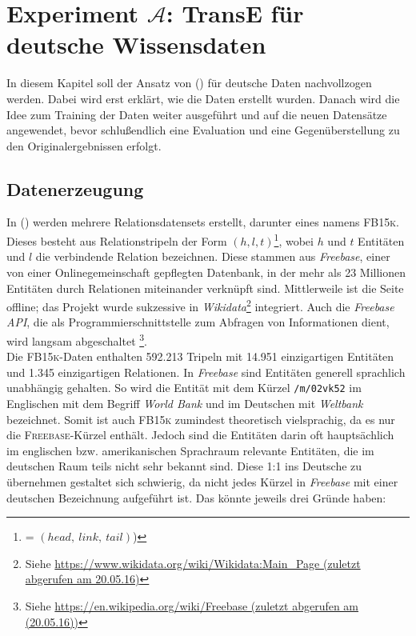 
\chapter{Experiment $\mathcal{A}$: TransE für deutsche Wissensdaten} %

\label{Chapter6} %


In diesem Kapitel soll der Ansatz von (\cite{bordes2013translating}) für deutsche Daten nachvollzogen werden.
Dabei wird erst erklärt, wie die Daten erstellt wurden. Danach wird die Idee zum Training der Daten weiter ausgeführt und
auf die neuen Datensätze angewendet, bevor schlußendlich eine Evaluation und eine Gegenüberstellung zu den Originalergebnissen
erfolgt.

\section{Datenerzeugung}

In (\cite{bordes2013translating}) werden mehrere Relationsdatensets erstellt, darunter eines namens \textsc{FB15k}. Dieses
besteht aus Relationstripeln der Form $(h, l, t)$\footnote{= $(head,\ link,\ tail)$)}, wobei
$h$ und $t$ Entitäten und $l$ die verbindende Relation bezeichnen. Diese stammen aus \emph{Freebase}, einer
von einer Onlinegemeinschaft gepflegten Datenbank, in der mehr als 23 Millionen Entitäten durch Relationen miteinander verknüpft sind.
Mittlerweile ist die Seite offline; das Projekt wurde sukzessive in \emph{Wikidata}\footnote{Siehe \url{https://www.wikidata.org/wiki/Wikidata:Main_Page (zuletzt abgerufen am 20.05.16)}} integriert. Auch die
\emph{Freebase API}, die als Programmierschnittstelle zum Abfragen von Informationen dient, wird langsam abgeschaltet
\footnote{Siehe \url{https://en.wikipedia.org/wiki/Freebase (zuletzt abgerufen am (20.05.16))}}.\\

Die \textsc{FB15k}-Daten enthalten 592.213 Tripeln mit 14.951 einzigartigen Entitäten und 1.345 einzigartigen Relationen.
In \emph{Freebase} sind Entitäten generell sprachlich unabhängig gehalten. So wird die Entität mit dem Kürzel \verb|/m/02vk52|
im Englischen mit dem Begriff \emph{World Bank} und im Deutschen mit \emph{Weltbank} bezeichnet. Somit ist auch
\textsc{FB15k} zumindest theoretisch vielsprachig, da es nur die \textsc{Freebase}-Kürzel enthält.
Jedoch sind die Entitäten darin oft hauptsächlich im englischen bzw. amerikanischen Sprachraum relevante
Entitäten, die im deutschen Raum teils nicht sehr bekannt sind. Diese 1:1 ins Deutsche zu übernehmen gestaltet sich schwierig,
da nicht jedes Kürzel in \emph{Freebase} mit einer deutschen Bezeichnung aufgeführt ist. Das könnte jeweils drei Gründe haben:

